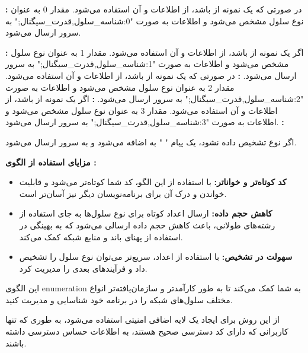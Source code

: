 \documentclass{report}
\begin{document}
\textbf{:}
در صورتی که
  یک نمونه از
   باشد، از اطلاعات
    و
     آن استفاده می‌شود.
مقدار 0 به عنوان نوع سلول
 مشخص می‌شود و اطلاعات به صورت "0:شناسه\_سلول,قدرت\_سیگنال;" به سرور ارسال می‌شود.

\textbf{:}
اگر 
 یک نمونه از 
  باشد، از اطلاعات
    و
      آن استفاده می‌شود.
مقدار 1 به عنوان نوع سلول
 مشخص می‌شود و اطلاعات به صورت "1:شناسه\_سلول,قدرت\_سیگنال;" به سرور ارسال می‌شود.
\textbf{:}
در صورتی که 
 یک نمونه از 
 باشد، از اطلاعات
   و 
    آن استفاده می‌شود.
مقدار 2 به عنوان نوع سلول 
مشخص می‌شود و اطلاعات به صورت "2:شناسه\_سلول,قدرت\_سیگنال;" به سرور ارسال می‌شود.
\textbf{:}
اگر 
 یک نمونه از 
  باشد، از اطلاعات
    و
     آن استفاده می‌شود.
مقدار 3 به عنوان نوع سلول 
 مشخص می‌شود و اطلاعات به صورت "3:شناسه\_سلول,قدرت\_سیگنال;" به سرور ارسال می‌شود.
\textbf{:}

اگر نوع
 تشخیص داده نشود، یک پیام "
 " به
   اضافه می‌شود و به سرور ارسال می‌شود.
   
\textbf{مزایای استفاده از الگوی
 :}
 \begin{itemize}
 	\item \textbf{کد کوتاه‌تر و خواناتر: }با استفاده از این الگو، کد شما کوتاه‌تر می‌شود و قابلیت خواندن و درک آن برای برنامه‌نویسان دیگر نیز آسان‌تر است.
 	\item 
 	\textbf{کاهش حجم داده: }ارسال اعداد کوتاه برای نوع سلول‌ها به جای استفاده از رشته‌های طولانی، باعث کاهش حجم داده ارسالی می‌شود که به بهینگی در استفاده از پهنای باند و منابع شبکه کمک می‌کند.
 	\item 
 	\textbf{سهولت در تشخیص: }با استفاده از اعداد، سریع‌تر می‌توان نوع سلول را تشخیص داد و فرآیندهای بعدی را مدیریت کرد.
 \end{itemize}
این الگوی
 enumeration
 به شما کمک می‌کند تا به طور کارآمد‌تر و سازمان‌یافته‌تر انواع مختلف سلول‌های شبکه را در برنامه خود شناسایی و مدیریت کنید.

از این روش برای ایجاد یک لایه اضافی امنیتی استفاده می‌شود، به طوری که تنها کاربرانی که دارای کد دسترسی صحیح هستند، به اطلاعات حساس دسترسی داشته باشند.
\end{document}
